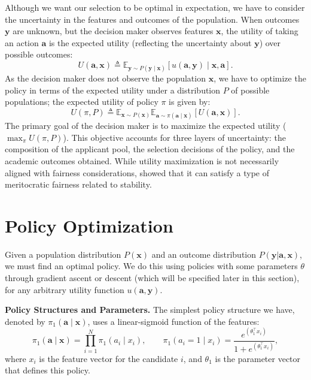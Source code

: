 \documentclass[acmlarge]{acmart-ecaf}
\newcommand {\pop} {N}
\newcommand {\Pfeat} {\mathbf{x}}
\newcommand {\pol} {\pi}
\newcommand {\Pact} {\mathbf{a}}
\newcommand {\Pout} {\mathbf{y}}
\begin{document}
 Although we want our selection to be optimal in expectation, we have to consider the uncertainty in the features and outcomes of the population. 
When outcomes \( \Pout \) are unknown, but the decision maker observes features \( \Pfeat \), the utility of taking an action \( \Pact \) is the expected utility (reflecting the uncertainty about \( \Pout \)) over possible outcomes:
\begin{equation}
\label{eq:U_ax}
U(\Pact, \Pfeat) \triangleq \mathbb{E}_{\Pout \sim P(\Pout \mid \Pfeat)} \left[ u(\Pact, \Pout) \mid \Pfeat , \Pact\right].
\end{equation}
As the decision maker does not observe the population $\Pfeat$, we have to optimize the policy in terms of the expected utility under a distribution $P$ of possible populations; the expected utility of policy $\pol$ is given by:
\begin{equation}
\label{eq:U_pi}
U(\pol, P) \triangleq \mathbb{E}_{\Pfeat \sim P(\Pfeat)} \mathbb{E}_{\Pact \sim \pol(\Pact \mid \Pfeat)} \left[ U(\Pact, \Pfeat) \right].
\end{equation}
 The primary goal of the decision maker is to maximize the expected utility ($\max_{\pol} U(\pol, P)$). This objective accounts for three layers of uncertainty: the composition of the applicant pool, the selection decisions of the policy, and the academic outcomes obtained.
While utility maximization is not necessarily aligned with fairness considerations, \cite{kleine2022meritocracy} showed that it can satisfy a type of meritocratic fairness related to stability. 

\section{Policy Optimization}
\label{sec:algorithm}
Given a population distribution $P(\Pfeat)$ and an outcome distribution $P(\Pout | \Pact, \Pfeat)$, we must find an optimal policy. We do this using policies with some parameters $\theta$ through gradient ascent or descent (which will be specified later in this section), for any arbitrary utility function $u(\Pact, \Pout)$. 

\textbf{Policy Structures and Parameters.}
The simplest policy structure we have, denoted by \( \pol_1(\Pact \mid \Pfeat) \), uses a linear-sigmoid function of the features:
\begin{equation}
\pol_1(\Pact \mid \Pfeat) = \prod_{i=1}^\pop \pol_1(a_i \mid x_i),
\qquad
\pol_1(a_i = 1 \mid x_i) = \frac{e^{(\theta_1^\top x_i)}}{1 + e^{(\theta_1^\top x_i)}},
\end{equation}
where \( x_i \) is the feature vector for the candidate \( i \), and \( \theta_1 \) is the parameter vector that defines this policy.  
\end{document}
